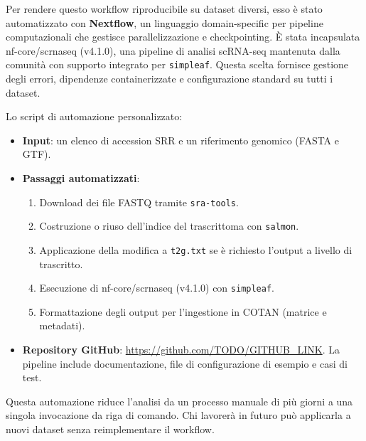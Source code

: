 Per rendere questo workflow riproducibile su dataset diversi, esso è stato automatizzato con \textbf{Nextflow}, un linguaggio domain-specific per pipeline computazionali che gestisce parallelizzazione e checkpointing. È stata incapsulata nf-core/scrnaseq (v4.1.0), una pipeline di analisi scRNA-seq mantenuta dalla comunità con supporto integrato per \texttt{simpleaf}. Questa scelta fornisce gestione degli errori, dipendenze containerizzate e configurazione standard su tutti i dataset.

Lo script di automazione personalizzato:

\begin{itemize}
    \item \textbf{Input}: un elenco di accession SRR e un riferimento genomico (FASTA e GTF).
    \item \textbf{Passaggi automatizzati}:
    \begin{enumerate}
        \item Download dei file FASTQ tramite \texttt{sra-tools}.
        \item Costruzione o riuso dell'indice del trascrittoma con \texttt{salmon}.
        \item Applicazione della modifica a \texttt{t2g.txt} se è richiesto l'output a livello di trascritto.
        \item Esecuzione di nf-core/scrnaseq (v4.1.0) con \texttt{simpleaf}.
        \item Formattazione degli output per l'ingestione in COTAN (matrice e metadati).
    \end{enumerate}

    \item \textbf{Repository GitHub}: \url{https://github.com/TODO/GITHUB_LINK}. La pipeline include documentazione, file di configurazione di esempio e casi di test.
\end{itemize}

Questa automazione riduce l'analisi da un processo manuale di più giorni a una singola invocazione da riga di comando. Chi lavorerà in futuro può applicarla a nuovi dataset senza reimplementare il workflow.




